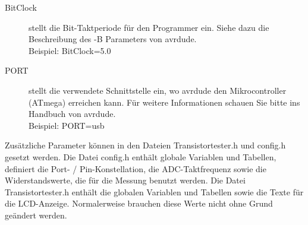 \begin{description}
  \item[BitClock] stellt die Bit-Taktperiode für den Programmer ein. Siehe dazu die Beschreibung des -B Parameters von avrdude.\\
Beispiel: BitClock=5.0

  \item[PORT] stellt die verwendete Schnittstelle ein, wo avrdude den Mikrocontroller (ATmega) erreichen kann.
Für weitere Informationen schauen Sie bitte ins Handbuch von avrdude.\\
Beispiel: PORT=usb

\end{description}

Zusätzliche Parameter können in den Dateien Transistortester.h und config.h gesetzt werden.
Die Datei config.h enthält globale Variablen und Tabellen, definiert die Port- / Pin-Konstellation,
die ADC-Taktfrequenz sowie die Widerstandswerte, die für die Messung benutzt werden.
Die Datei Transistortester.h enthält die globalen Variablen und Tabellen sowie die Texte für die LCD-Anzeige.
Normalerweise brauchen diese Werte nicht ohne Grund geändert werden.
